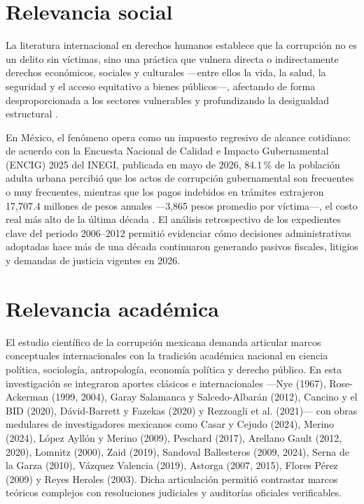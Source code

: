 

\section{Relevancia social}

La literatura internacional en derechos humanos establece que la corrupción no es un delito sin víctimas, sino una práctica que vulnera directa o indirectamente derechos económicos, sociales y culturales ---entre ellos la vida, la salud, la seguridad y el acceso equitativo a bienes públicos---, afectando de forma desproporcionada a los sectores vulnerables y profundizando la desigualdad estructural \citep{cidh2019,cndh2019,rios2021}. 

En México, el fenómeno opera como un impuesto regresivo de alcance cotidiano: de acuerdo con la Encuesta Nacional de Calidad e Impacto Gubernamental (ENCIG) 2025 del INEGI, publicada en mayo de 2026, 84.1\,\% de la población adulta urbana percibió que los actos de corrupción gubernamental son frecuentes o muy frecuentes, mientras que los pagos indebidos en trámites extrajeron 17,707.4 millones de pesos anuales ---3,865 pesos promedio por víctima---, el costo real más alto de la última década \citep{inegi2026,imco2026}. El análisis retrospectivo de los expedientes clave del periodo 2006--2012 permitió evidenciar cómo decisiones administrativas adoptadas hace más de una década continuaron generando pasivos fiscales, litigios y demandas de justicia vigentes en 2026.

\section{Relevancia académica}

El estudio científico de la corrupción mexicana demanda articular marcos conceptuales internacionales con la tradición académica nacional en ciencia política, sociología, antropología, economía política y derecho público. En esta investigación se integraron aportes clásicos e internacionales ---Nye (1967), Rose-Ackerman (1999, 2004), Garay Salamanca y Salcedo-Albarán (2012), Cancino y el BID (2020), Dávid-Barrett y Fazekas (2020) y Rezzoagli et al. (2021)--- con obras medulares de investigadores mexicanos como Casar y Cejudo (2024), Merino (2024), López Ayllón y Merino (2009), Peschard (2017), Arellano Gault (2012, 2020), Lomnitz (2000), Zaid (2019), Sandoval Ballesteros (2009, 2024), Serna de la Garza (2010), Vázquez Valencia (2019), Astorga (2007, 2015), Flores Pérez (2009) y Reyes Heroles (2003). Dicha articulación permitió contrastar marcos teóricos complejos con resoluciones judiciales y auditorías oficiales verificables.

